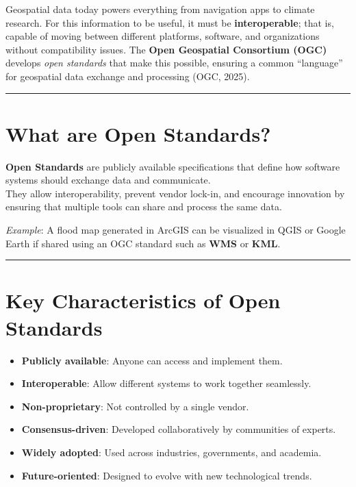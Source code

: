 \documentclass[
  11pt,
  letterpaper,
]{book}
\providecommand{\tightlist}{%
  \setlength{\itemsep}{0pt}\setlength{\parskip}{0pt}}
\begin{document}
Geospatial data today powers everything from navigation apps to climate
research. For this information to be useful, it must be
\textbf{interoperable}; that is, capable of moving between different
platforms, software, and organizations without compatibility issues. The
\textbf{Open Geospatial Consortium (OGC)} develops \emph{open standards}
that make this possible, ensuring a common ``language'' for geospatial
data exchange and processing (OGC, 2025).

\begin{center}\rule{0.5\linewidth}{0.5pt}\end{center}

\section{What are Open Standards?}\label{what-are-open-standards}

\textbf{Open Standards} are publicly available specifications that
define how software systems should exchange data and communicate.\\
They allow interoperability, prevent vendor lock-in, and encourage
innovation by ensuring that multiple tools can share and process the
same data.

\emph{Example}: A flood map generated in ArcGIS can be visualized in
QGIS or Google Earth if shared using an OGC standard such as
\textbf{WMS} or \textbf{KML}.

\begin{center}\rule{0.5\linewidth}{0.5pt}\end{center}

\section{Key Characteristics of Open
Standards}\label{key-characteristics-of-open-standards}

\begin{itemize}
\tightlist
\item
  \textbf{Publicly available}: Anyone can access and implement them.\\
\item
  \textbf{Interoperable}: Allow different systems to work together
  seamlessly.\\
\item
  \textbf{Non-proprietary}: Not controlled by a single vendor.\\
\item
  \textbf{Consensus-driven}: Developed collaboratively by communities of
  experts.\\
\item
  \textbf{Widely adopted}: Used across industries, governments, and
  academia.\\
\item
  \textbf{Future-oriented}: Designed to evolve with new technological
  trends.
\end{itemize}
\end{document}
